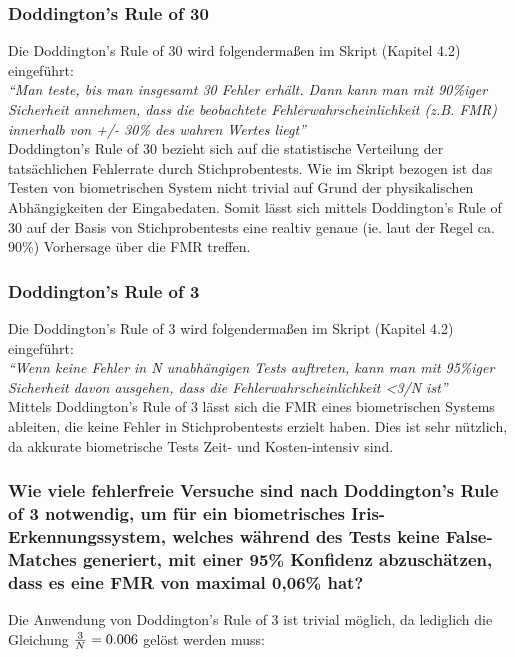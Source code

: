 \documentclass{article}
\begin{document}
\subsubsection{Doddington’s Rule of 30}

Die Doddington's Rule of 30 wird folgendermaßen im Skript (Kapitel 4.2) eingeführt:\\[0.1em]

\textit{``Man teste, bis man insgesamt 30 Fehler erhält. Dann kann man mit 90\%iger Sicherheit annehmen, 
dass die beobachtete Fehlerwahrscheinlichkeit (z.B. FMR) innerhalb von +/- 30\% des wahren
Wertes liegt''}\\[0.1em]

Doddington's Rule of 30 bezieht sich auf die statistische Verteilung der tatsächlichen Fehlerrate durch 
Stichprobentests. Wie im Skript bezogen ist das Testen von biometrischen System nicht trivial auf Grund 
der physikalischen Abhängigkeiten der Eingabedaten. Somit lässt sich mittels Doddington's Rule of 30 auf
der Basis von Stichprobentests eine realtiv genaue (ie. laut der Regel ca. 90\%) Vorhersage über die FMR 
treffen.

\subsubsection{Doddington’s Rule of 3}

Die Doddington's Rule of 3 wird folgendermaßen im Skript (Kapitel 4.2) eingeführt:\\[0.1em]

\textit{``Wenn keine Fehler in N unabhängigen Tests auftreten, kann man mit
95\%iger Sicherheit davon ausgehen, dass die Fehlerwahrscheinlichkeit <3/N ist''}\\[0.1em]

Mittels Doddington's Rule of 3 lässt sich die FMR eines biometrischen Systems ableiten, die keine Fehler
in Stichprobentests erzielt haben. Dies ist sehr nützlich, da akkurate biometrische Tests Zeit- und 
Kosten-intensiv sind.

\subsubsection{Wie viele fehlerfreie Versuche sind nach Doddington’s Rule of 3 notwendig, um für ein biometrisches Iris-Erkennungssystem, welches während des Tests keine False-Matches generiert, mit einer 95\% Konfidenz abzuschätzen, dass es eine FMR von maximal 0,06\% hat?
}

Die Anwendung von Doddington's Rule of 3 ist trivial möglich, da lediglich die Gleichung ${3 \over N} = 0.006$ gelöst 
werden muss:
\end{document}
